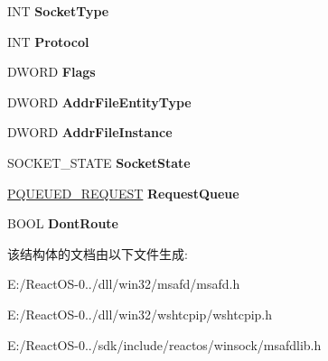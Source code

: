 \begin{DoxyCompactItemize}
I\+NT {\bfseries Socket\+Type}
\item 
\mbox{\label{struct___s_o_c_k_e_t___c_o_n_t_e_x_t_ae75287d471e165e0ebe8d0c97ce26dad}} 
I\+NT {\bfseries Protocol}
\item 
\mbox{\label{struct___s_o_c_k_e_t___c_o_n_t_e_x_t_a56a6ac74d54d997ec54829943cb34ea0}} 
D\+W\+O\+RD {\bfseries Flags}
\item 
\mbox{\label{struct___s_o_c_k_e_t___c_o_n_t_e_x_t_a24debc57e6791674909a4c9b5895cc4c}} 
D\+W\+O\+RD {\bfseries Addr\+File\+Entity\+Type}
\item 
\mbox{\label{struct___s_o_c_k_e_t___c_o_n_t_e_x_t_aa97e056bf4c9c354a99ed8c73c461e1e}} 
D\+W\+O\+RD {\bfseries Addr\+File\+Instance}
\item 
\mbox{\label{struct___s_o_c_k_e_t___c_o_n_t_e_x_t_ac19385e96ea9be11e78660e0567f576e}} 
S\+O\+C\+K\+E\+T\+\_\+\+S\+T\+A\+TE {\bfseries Socket\+State}
\item 
\mbox{\label{struct___s_o_c_k_e_t___c_o_n_t_e_x_t_aa56dd855bbe0a1409c5a155ea788447c}} 
\hyperlink{struct___q_u_e_u_e_d___r_e_q_u_e_s_t}{P\+Q\+U\+E\+U\+E\+D\+\_\+\+R\+E\+Q\+U\+E\+ST} {\bfseries Request\+Queue}
\item 
\mbox{\label{struct___s_o_c_k_e_t___c_o_n_t_e_x_t_aa9b0cefc044ebb479102fb13592cdc01}} 
B\+O\+OL {\bfseries Dont\+Route}
\end{DoxyCompactItemize}


该结构体的文档由以下文件生成\+:\begin{DoxyCompactItemize}
\item 
E\+:/\+React\+O\+S-\/0../dll/win32/msafd/msafd.\+h\item 
E\+:/\+React\+O\+S-\/0../dll/win32/wshtcpip/wshtcpip.\+h\item 
E\+:/\+React\+O\+S-\/0../sdk/include/reactos/winsock/msafdlib.\+h\end{DoxyCompactItemize}
